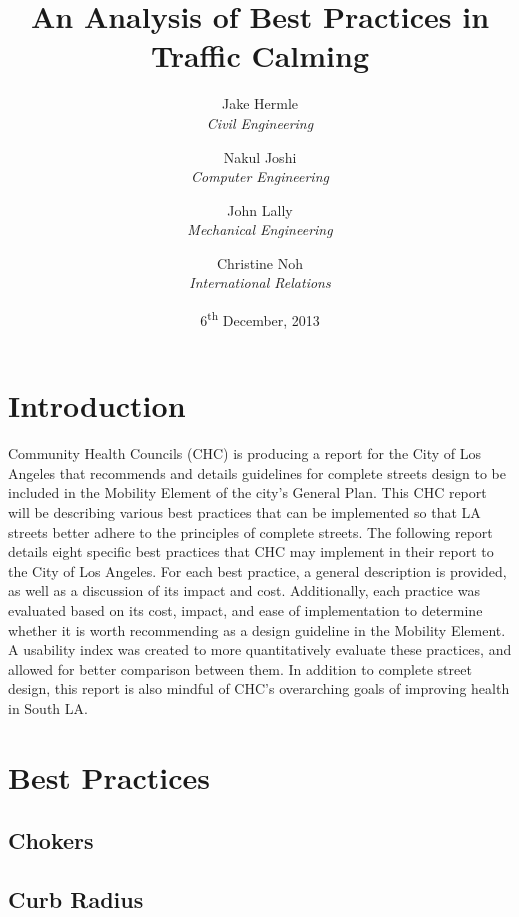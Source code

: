 \documentclass[titlepage,oneside]{article}
\title{An Analysis of Best Practices in Traffic Calming}
\author{
	Jake Hermle\\ \emph{Civil Engineering} \and
	Nakul Joshi\\ \emph{Computer Engineering} \and
	John Lally\\ \emph{Mechanical Engineering}\and
	Christine Noh\\ \emph{International Relations}
}
\date{6\textsuperscript{th} December, 2013}
\begin{document}
\listoftodos

\newpage
{}

\maketitle

\begin{abstract}
\end{abstract}


\tableofcontents
\newpage
\listoffigures
\newpage
\listoftables
\newpage



\section{Introduction}

Community Health Councils (CHC) is producing a report for the City of Los Angeles that recommends and details guidelines for complete streets design to be included in the Mobility Element of the city’s General Plan. This CHC report will be describing various best practices that can be implemented so that LA streets better adhere to the principles of complete streets. The following report details eight specific best practices that CHC may implement in their report to the City of Los Angeles. For each best practice, a general description is provided, as well as a discussion of its impact and cost. Additionally, each practice was evaluated based on its cost, impact, and ease of implementation to determine whether it is worth recommending as a design guideline in the Mobility Element. A usability index was created to more quantitatively evaluate these practices, and allowed for better comparison between them. In addition to complete street design, this report is also mindful of CHC’s overarching goals of improving health in South LA.

\newpage

\section{Best Practices}
	\subsection{Chokers}
		
	\subsection{Curb Radius}
		
\newpage
\end{document}
